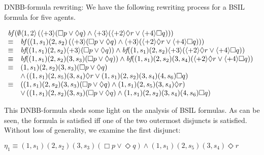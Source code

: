 \documentclass[11pt]{article}
\newcommand{\embf}{\textit{bf}}
\newcommand{\pfrr}{\Box}
\newcommand{\pevt}{\Diamond}
\begin{document}
{\example \label{exmp.dn-bbf} DNBB-formula rewriting:}
We have the following rewriting process for a BSIL formula for five agents.
\begin{center}
$\begin{array}{ll}
\multicolumn{2}{l}{
  \embf\left(\emptyset\langle 1,2\rangle\left( 
    	\langle+3\rangle(\pfrr p\vee \pevt q
    	) 
  \wedge \langle+3\rangle(\langle+2\rangle \pevt r
	\vee \langle+ 4\rangle\pfrr q)
  \right) \right) }\\ 

\equiv	&  
\embf\left((1,s_1)(2,s_2)\left( 
    	\langle+3\rangle(\pfrr p\vee \pevt q
    	) 
  \wedge \langle+3\rangle(\langle+2\rangle \pevt r\vee \langle+ 4\rangle\pfrr q)
  \right)\right)\\ 

\equiv & %
\embf((1, s_1)(2,s_2)\langle+3\rangle(\pfrr p\vee \pevt q)) %
\wedge %
  \embf((1,s_1)(2,s_2)\langle+3\rangle(
    \langle+2\rangle \pevt r\vee \langle+ 4\rangle\pfrr q
  ))
\\ 
\equiv & \embf((1, s_1)(2,s_2)(3,s_3)(
	    \pfrr p\vee \pevt q
	    )) 
	\wedge  
	  \embf((1,s_1)(2,s_2)(3,s_4)
	    (\langle+ 2\rangle \pevt r\vee \langle+ 4\rangle\pfrr q))
	\\ 
\equiv & (1,s_1)(2,s_2)(3,s_3)(
	    \pfrr p\vee \pevt q
	    )\\ 
	& \wedge \left(
	  (1,s_1)(2,s_5)(3,s_4)
	    \pevt r
	  \vee 
	  (1,s_1)(2,s_2)(3,s_4)(4,s_6)
	     \pfrr q\right)
	\\ 
\equiv & \left((1,s_1)(2,s_2)(3,s_3)(
	    \pfrr p\vee \pevt q
	    )\wedge (1,s_1)(2,s_5)(3,s_4)
	    \pevt r\right)\\ 
	& \vee \left((1,s_1)(2,s_2)(3,s_3)(
	    \pfrr p\vee \pevt q
	    )\wedge  
	  (1,s_1)(2,s_2)(3,s_4)(4,s_6)
	     \pfrr q\right)
	\\ 
\end{array}$
\end{center} 
This DNBB-formula sheds some light on the analysis of BSIL formulas.
As can be seen,
the formula is satisfied iff one of the two 
outermost disjuncts is satisfied.
Without loss of generality, we examine the first disjunct: 
\begin{center}
$\eta_1\equiv (1,s_1)(2,s_2)(3,s_3)(
	    \pfrr p\vee \pevt q
	    )\wedge (1,s_1)(2,s_5)(3,s_4)
	    \pevt r$
\end{center}
\end{document}
